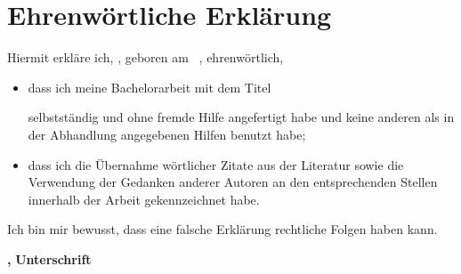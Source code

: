 \chapter*{Ehrenwörtliche Erklärung}
Hiermit erkläre ich, \trauthor, geboren am \trgeburt\ \trgeburtort, ehrenwörtlich,
\begin{itemize}
\item dass ich meine Bachelorarbeit mit dem Titel

\textbf{\large \glqq\trtitleDE\grqq{}}

selbstständig und ohne fremde Hilfe angefertigt habe und keine anderen als in der
Abhandlung angegebenen Hilfen benutzt habe;
\item dass ich die Übernahme wörtlicher Zitate aus der Literatur
sowie die Verwendung der Gedanken anderer Autoren an den entsprechenden
Stellen innerhalb der Arbeit gekennzeichnet habe.
\end{itemize}
Ich bin mir bewusst, dass eine falsche Erklärung rechtliche Folgen haben kann.
\vspace*{3cm}

\textbf{\trort, \trdate} \hfill \textbf{Unterschrift} \hspace{2cm}
